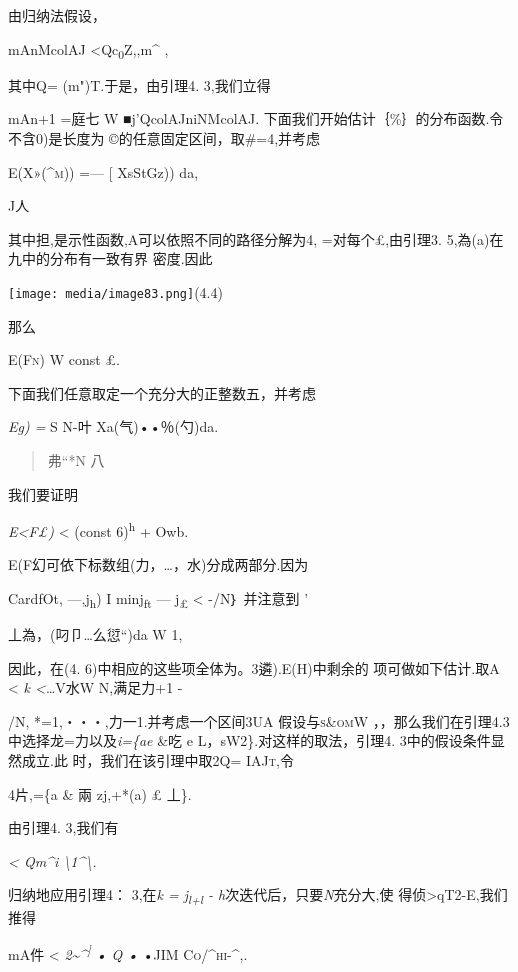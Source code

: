由归纳法假设，

mAnMcolAJ \textless{}Qc\textsubscript{0}\textbar{}Z,,\textbar{}m\^{} ,

其中Q= (m")T.于是，由引理4. 3,我们立得

mAn+1 =庭七 W ■j'QcolAJniNMcolAJ. \textbar{}
下面我们开始估计｛\%｝的分布函数.令不含0)是长度为
©的任意固定区间，取\#=4,并考虑

\textsc{E(X»(\^{}m))} =--- {[} XsStGz)) da,

J人

其中担,是示性函数,A可以依照不同的路径分解为4, =对每个£,由引理3.
5,為(a)在九中的分布有一致有界 密度.因此

\texttt{[image: media/image83.png]}(4.4)

那么

\textsc{E(Fn)} W const £.

下面我们任意取定一个充分大的正整数五，并考虑

\emph{Eg) =} S N-叶 Xa(气)••％(勺)da.

\begin{quote}
弗``*N 八
\end{quote}

我们要证明

\emph{E\textless{}F£)} \textless{} (const 6)\textsuperscript{h} + Owb.

E(F幻可依下标数组(力，\ldots{}，水)分成两部分.因为

CardfOt, ---,j\textsubscript{h}) I min\textbar{}j\textsubscript{ft} ---
j\textsubscript{£}\textbar{} \textless{} -/N｝ 并注意到 '

丄為，(叼卩\ldots{}么愆``)da W 1,

因此，在(4. 6)中相应的这些项全体为。3遴).E(H)中剩余的 项可做如下估计.取A
\textless{} \emph{k \textless{}}\ldots{}V水W N,满足力+1 -

/N, *=1,・・・,力一1.并考虑一个区间3UA 假设与\textsc{s\&omW}
，，那么我们在引理4.3中选择龙=力以及\emph{i=\{ae} \&吃 e
L，sW2\}.对这样的取法，引理4. 3中的假设条件显然成立.此
时，我们在该引理中取2Q= \textsc{IAJt,}令

4片,=\{a \& 兩 \textbar{}zj,+*(a) £ 丄\}.

由引理4. 3,我们有

\emph{\textless{} Qm\^{}i \textbackslash{}1\^{}\textbackslash{}.}

归纳地应用引理4： 3,在\emph{k = j\textsubscript{l+l} -
h}次迭代后，只要\emph{N}充分大,使
得\textbar{}侦\textgreater{}qT2-E,我们推得

mA件 \textless{} \emph{2\textasciitilde{}\^{}\textsuperscript{{]}} • Q
•} \textsc{•JIM Co\textbar{}/\^{}\textbar{}hi-\^{},.}

